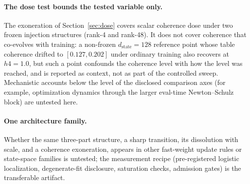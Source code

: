 \paragraph{The dose test bounds the tested variable only.} The
exoneration of Section~\ref{sec:dose} covers scalar coherence dose under
two frozen injection structures (rank-4 and rank-48). It does not cover
coherence that co-evolves with training: a non-frozen
$d_{\mathrm{state}}=128$ reference point whose table coherence drifted to
$[0.127, 0.202]$ under ordinary training also recovers at $h4 = 1.0$,
but such a point confounds the coherence level with how the level was
reached, and is reported as context, not as part of the controlled sweep.
Mechanistic accounts below the level of the disclosed comparison axes
(for example, optimization dynamics through the larger eval-time
Newton--Schulz block) are untested here.

\paragraph{One architecture family.} Whether the same three-part
structure, a sharp transition, its dissolution with scale, and a
coherence exoneration, appears in other fast-weight update rules or
state-space families is untested; the measurement recipe (pre-registered
logistic localization, degenerate-fit disclosure, saturation checks,
admission gates) is the transferable artifact.
